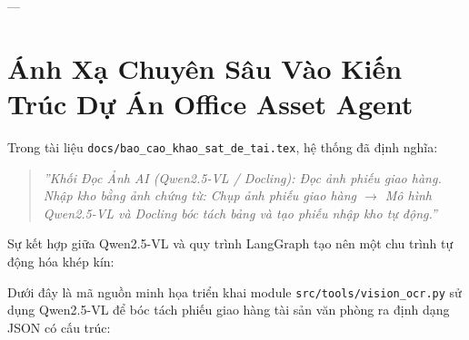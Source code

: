 \documentclass[11pt,a4paper]{article}
\begin{document}
---

\section{Ánh Xạ Chuyên Sâu Vào Kiến Trúc Dự Án Office Asset Agent}

\begin{deepdivebox}
Trong tài liệu \texttt{docs/bao\_cao\_khao\_sat\_de\_tai.tex}, hệ thống đã định nghĩa:
\begin{quote}
\textit{''Khối Đọc Ảnh AI (Qwen2.5-VL / Docling): Đọc ảnh phiếu giao hàng. Nhập kho bằng ảnh chứng từ: Chụp ảnh phiếu giao hàng $\rightarrow$ Mô hình Qwen2.5-VL và Docling bóc tách bảng và tạo phiếu nhập kho tự động.''}
\end{quote}
Sự kết hợp giữa Qwen2.5-VL và quy trình LangGraph tạo nên một chu trình tự động hóa khép kín:
\end{deepdivebox}

Dưới đây là mã nguồn minh họa triển khai module \texttt{src/tools/vision\_ocr.py} sử dụng Qwen2.5-VL để bóc tách phiếu giao hàng tài sản văn phòng ra định dạng JSON có cấu trúc:
\end{document}
